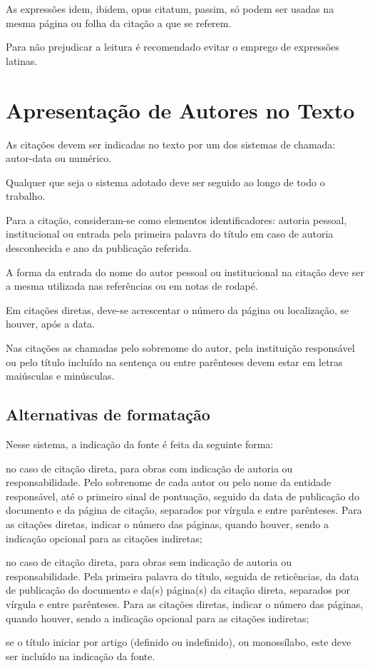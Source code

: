 As expressões idem, ibidem, opus citatum, passim, só podem ser usadas na mesma página ou folha da citação a que se referem.

Para não prejudicar a leitura é recomendado evitar o emprego de
expressões latinas.


\section{Apresentação de Autores no Texto}

As citações devem ser indicadas no texto por um dos sistemas de chamada: autor-data ou numérico.

Qualquer que seja o sistema adotado deve ser seguido ao longo de todo o trabalho. 

Para a citação, consideram-se como elementos identificadores: autoria pessoal, institucional ou entrada pela primeira palavra do título em caso de autoria desconhecida e ano da publicação referida.

A forma da entrada do nome do autor pessoal ou institucional na citação deve ser a mesma utilizada nas referências ou em notas de rodapé.

Em citações diretas, deve-se acrescentar o número da página ou localização, se houver, após a data.

Nas citações as chamadas pelo sobrenome do autor, pela instituição responsável ou pelo título incluído na sentença ou entre parênteses devem estar em letras maiúsculas e minúsculas.

\subsection{Alternativas de formatação}
Nesse sistema, a indicação da fonte é feita da seguinte forma:

\begin{alineas}
	\item
	no caso de citação direta, para obras com indicação de autoria ou responsabilidade. Pelo sobrenome de cada autor ou pelo nome da entidade responsável, até o primeiro sinal de pontuação, seguido da data de publicação do documento e da página de citação, separados por vírgula e entre parênteses. Para as citações diretas, indicar o número das páginas, quando houver, sendo a indicação opcional para as citações indiretas;
	\item
	no caso de citação direta, para obras sem indicação de autoria ou responsabilidade. Pela primeira palavra do título, seguida de reticências, da data de publicação do documento e da(s) página(s) da citação direta, separados por vírgula e entre parênteses.  Para as citações diretas, indicar o número das páginas, quando houver, sendo a indicação opcional para as citações indiretas;
	\item
	se o título iniciar por artigo (definido ou indefinido), ou monossílabo, este deve ser incluído na indicação da fonte.
	
\end{alineas}
	
